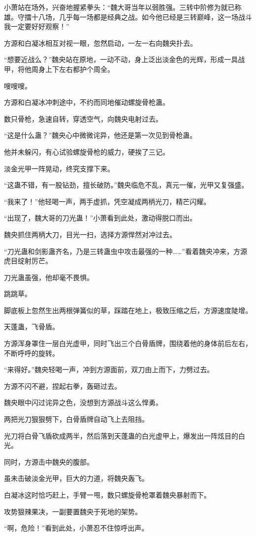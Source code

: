 \begin{this_body}
小萧站在场外，兴奋地握紧拳头：“魏大哥当年以弱胜强。三转中阶修为就已称雄。守擂十八场，几乎每一场都是经典之战。如今他已经是三转巅峰，这一场战斗我一定要好好观察！”

方源和白凝冰相互对视一眼，忽然启动，一左一右向魏央扑去。

“想要近战么？”魏央站在原地，一动不动，身上泛出淡金色的光辉，形成一具战甲，将他周身上下左右都护个周全。

嗖嗖嗖。

方源和白凝冰冲刺途中，不约而同地催动螺旋骨枪蛊。

数只骨枪，急速自转，穿透空气，向魏央电射过去。

“这是什么蛊？”魏央心中微微诧异，他还是第一次见到骨枪蛊。

他并未躲闪，有心试验螺旋骨枪的威力，硬挨了三记。

淡金光甲一阵晃动，终究支撑下来。

“这蛊不错，有一股钻劲，擅长破防。”魏央临危不乱，真元一催，光甲又复强盛。

“我来了！”他轻喝一声，两手虚抓，凭空凝成两柄光刀，精芒闪耀。

“出现了，魏大哥的刀光蛊！”小萧看到此处，激动得脱口而出。

魏央抓住两柄大刀，目光一扫，选择方源悍然对冲过去。

“刀光蛊和剑影蛊齐名，乃是三转蛊虫中攻击最强的一种……”看着魏央冲来，方源虎目绽射厉芒。

刀光蛊虽强，他却毫不畏惧。

跳跳草。

脚底板上忽然生出两根弹簧似的草，踩踏在地上，极致压缩之后，方源速度陡增。

天蓬蛊，飞骨盾。

方源浑身罩住一层白光虚甲，同时飞出三个白骨盾牌，围绕着他的身体前后左右，不断呼呼的旋转。

“来得好。”魏央轻喝一声，冲到方源面前，双刀由上而下，力劈过去。

方源不闪不避，捏起右拳，轰砸过去。

魏央眼中闪过诧异之色，没想到方源战斗这么悍勇。

两把光刀狠狠劈下，白骨盾牌自动飞上去阻挡。

光刀将白骨飞盾砍成两半，然后落到天蓬蛊的白光虚甲上，爆发出一阵炫目的白光。

同时，方源击中魏央的腹部。

虽未击破淡金光甲，巨大的力道，将魏央轰飞。

白凝冰这时恰巧赶上，手臂一甩，数只螺旋骨枪罩着魏央暴射而下。

攻势狠辣果决，一副要置魏央于死地的架势。

“啊，危险！”看到此处，小萧忍不住惊呼出声。

\end{this_body}

